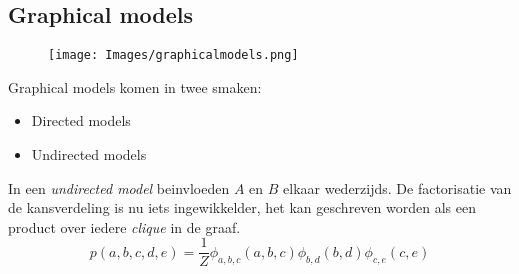{\subsection{Graphical models}

\begin{figure}[h]
    \centering
    \texttt{[image: Images/graphicalmodels.png]}
    \caption*{}
    \label{fig:graphicalmodels}
\end{figure}

Graphical models komen in twee smaken:
\begin{itemize}
    \item Directed models
    \item Undirected models
\end{itemize}
In een \textit{undirected model} beinvloeden $A$ en $B$ elkaar wederzijds. De factorisatie van de kansverdeling is nu iets ingewikkelder, het kan geschreven worden als een product over iedere \textit{clique} in de graaf.
\[p(a,b,c,d,e)=\frac{1}{Z}\phi_{a,b,c}(a,b,c)\phi_{b,d}(b,d)\phi_{c,e}(c,e)\]

}
